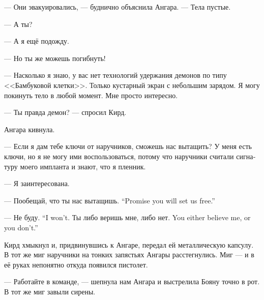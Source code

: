 \documentclass[a4paper,12pt,fleqn]{book}\usepackage{polyglossia}\setdefaultlanguage[babelshorthands=true]{russian}\setotherlanguage{english}\defaultfontfeatures{Ligatures=TeX,Mapping=tex-text}
\begin{document}
--- Они эвакуировались, --- буднично объяснила Ангара.
--- Тела пустые.

--- А ты?

--- А я ещё подожду.

--- Но ты же можешь погибнуть!

--- Насколько я знаю, у вас нет технологий удержания демонов по типу <<Бамбуковой клетки>>.
Только кустарный экран с небольшим зарядом.
Я могу покинуть тело в любой момент.
Мне просто интересно.

--- Ты правда демон? --- спросил Кирд.

Ангара кивнула.

--- Если я дам тебе ключи от наручников, сможешь нас вытащить?
У меня есть ключи, но я не могу ими воспользоваться, потому что наручники считали сигнатуру моего импланта и знают, что я пленник.

--- Я заинтересована.

{--- Пообещай, что ты нас вытащишь.}
{``Promise you will set us free.''}

{--- Не буду.}
{``I won't.}
{Ты либо веришь мне, либо нет.}
{You either believe me, or you don't.''}

Кирд хмыкнул и, придвинувшись к Ангаре, передал ей металлическую капсулу.
В тот же миг наручники на тонких запястьях Ангары расстегнулись.
Миг --- и в её руках непонятно откуда появился пистолет.

--- Работайте в команде, --- шепнула нам Ангара и выстрелила Бояну точно в рот.
В тот же миг завыли сирены.
\end{document}
